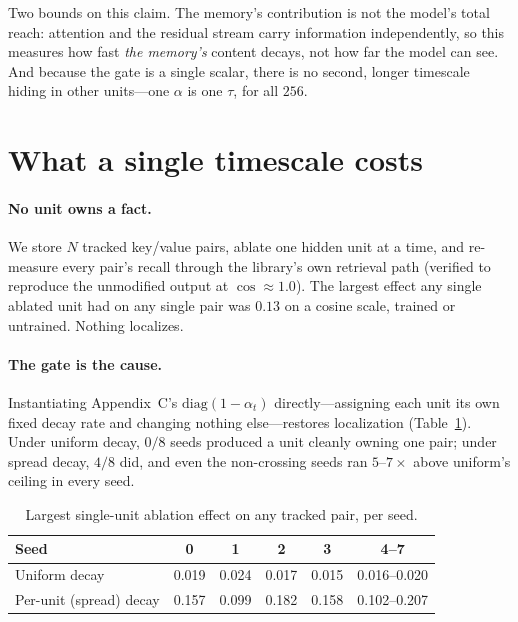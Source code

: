 \documentclass{article}
\begin{document}
Two bounds on this claim. The memory's contribution is not the model's total
reach: attention and the residual stream carry information independently, so
this measures how fast \emph{the memory's} content decays, not how far the model
can see. And because the gate is a single scalar, there is no second, longer
timescale hiding in other units---one $\alpha$ is one $\tau$, for all $256$.

\section{What a single timescale costs}

\paragraph{No unit owns a fact.} We store $N$ tracked key/value pairs, ablate one
hidden unit at a time, and re-measure every pair's recall through the library's
own retrieval path (verified to reproduce the unmodified output at
$\cos\approx1.0$). The largest effect any single ablated unit had on any single
pair was $\mathbf{0.13}$ on a cosine scale, trained or untrained. Nothing
localizes.

\paragraph{The gate is the cause.} Instantiating Appendix~C's
$\mathrm{diag}(1-\alpha_t)$ directly---assigning each unit its own fixed decay
rate and changing nothing else---restores localization
(Table~\ref{tab:perunit}). Under uniform decay, $0/8$ seeds produced a unit
cleanly owning one pair; under spread decay, $4/8$ did, and even the
non-crossing seeds ran $5$--$7\times$ above uniform's ceiling in every seed.

\begin{table}[h]
\centering
\caption{Largest single-unit ablation effect on any tracked pair, per seed.}
\label{tab:perunit}
\small
\begin{tabular}{lccccc}
\toprule
Seed & 0 & 1 & 2 & 3 & 4--7 \\
\midrule
Uniform decay & 0.019 & 0.024 & 0.017 & 0.015 & 0.016--0.020 \\
Per-unit (spread) decay & 0.157 & 0.099 & 0.182 & 0.158 & 0.102--0.207 \\
\bottomrule
\end{tabular}
\end{table}
\end{document}
